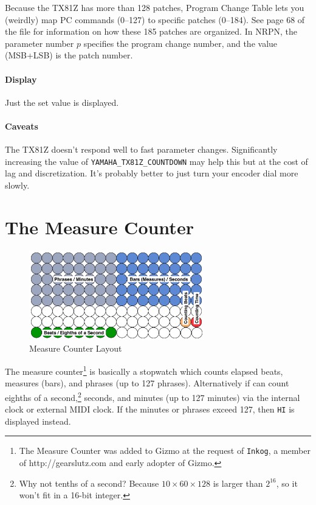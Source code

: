 \documentclass{article}
\begin{document}
Because the TX81Z has more than 128 patches, Program Change Table lets you (weirdly) map PC commands (0--127) to specific patches (0--184).  See page 68 of the file for information on how these 185 patches are organized.  In NRPN, the parameter number \(p\) specifies the program change number, and the value (MSB+LSB) is the patch number.

\paragraph{Display} Just the set value is displayed.

\paragraph{Caveats}  The TX81Z doesn't respond well to fast parameter changes.    Significantly increasing the value of \texttt{YAMAHA\_TX81Z\_COUNTDOWN} may help this but at the cost of lag and discretization.  It's probably better to just turn your encoder dial more slowly.


\clearpage

\section {The Measure Counter}
\label{measure}

\begin{figure}
\vspace{-1.5em}\includegraphics[width=3in]{measure}
\vspace{-2em}\caption{\small Measure Counter Layout}
\vspace{-1em}\label{measurecounter}
\end{figure}

	The measure counter\footnote{The Measure Counter was added to Gizmo at the request of \texttt{Inkog}, a member of http:/\!/gearslutz.com and early adopter of Gizmo.} is basically a stopwatch which counts elapsed beats, measures (bars), and phrases (up to 127 phrases).  Alternatively if can count eighths of a second,\footnote{\label{footnotetenths}Why not tenths of a second?  Because \(10 \times 60 \times 128\) is larger than \(2^{16}\), so it won't fit in a 16-bit integer.} seconds, and minutes (up to 127 minutes) via the internal clock or external MIDI clock.  If the minutes or phrases exceed 127, then \texttt{HI} is displayed instead.
	
\end{document}

